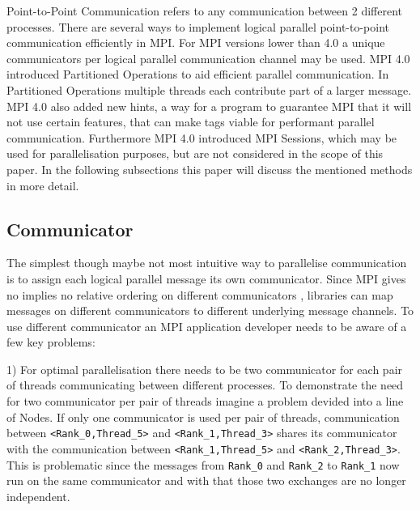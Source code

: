 \documentclass[sigconf]{acmart}
\begin{document}
Point-to-Point Communication refers to any communication between 2 different processes.
There are several ways to implement logical parallel point-to-point communication efficiently in MPI.
For MPI versions lower than 4.0 a unique communicators per logical parallel communication channel may be used.
MPI 4.0 introduced Partitioned Operations to aid efficient parallel communication.
In Partitioned Operations multiple threads each contribute part of a larger message.
MPI 4.0 also added new hints, a way for a program to guarantee MPI that it will not use certain features, that can make tags viable for performant parallel communication.
Furthermore MPI 4.0 introduced MPI Sessions, which may be used for parallelisation purposes, but are not considered in the scope of this paper.
In the following subsections this paper will discuss the mentioned methods in more detail.

\subsection{Communicator}

The simplest though maybe not most intuitive way to parallelise communication is to assign each logical parallel message its own communicator.
Since MPI gives no implies no relative ordering on different communicators \cite{zambreLessonsLearned2022}, libraries can map messages on different communicators to different underlying message channels.
To use different communicator an MPI application developer needs to be aware of a few key problems:

1) For optimal parallelisation there needs to be two communicator for each pair of threads communicating between different processes.
To demonstrate the need for two communicator per pair of threads imagine a problem devided into a line of Nodes.
If only one communicator is used per pair of threads, communication between \verb|<Rank_0,Thread_5>| and \verb|<Rank_1,Thread_3>| shares its communicator with the communication between \verb|<Rank_1,Thread_5>| and \verb|<Rank_2,Thread_3>|.
This is problematic since the messages from \verb|Rank_0| and \verb|Rank_2| to \verb|Rank_1| now run on the same communicator and with that those two exchanges are no longer independent.
\end{document}
